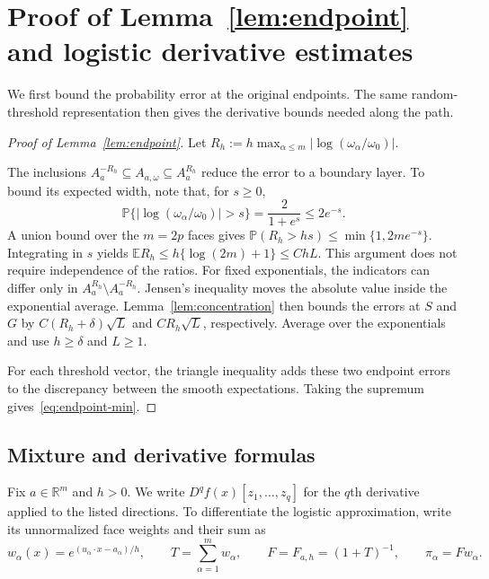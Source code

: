 \documentclass[11pt,letterpaper]{article}
\theoremstyle{remark}
\newcommand{\E}{\mathbb E}
\newcommand{\Pp}{\mathbb P}
\newcommand{\R}{\mathbb R}
\begin{document}
\clearpage
\appendix
{}

\section{Proof of Lemma~\ref*{lem:endpoint} and logistic derivative estimates}\label{appx-sec:smoothing}
We first bound the probability error at the original endpoints.
The same random-threshold representation then gives the derivative
bounds needed along the path.
\begin{proof}[Proof of Lemma~\ref{lem:endpoint}]
Let \(R_h:=h\max_{\alpha\le m}|\log(\omega_\alpha/\omega_0)|\).

The inclusions \(A_a^{-R_h}\subseteq A_{a,\omega}\subseteq A_a^{R_h}\)
reduce the error to a boundary layer. To bound its expected width,
note that, for \(s\ge0\),
\[
 \Pp\{|\log(\omega_\alpha/\omega_0)|>s\}
 =\frac2{1+e^s}\le2e^{-s}.
\]
A union bound over the \(m=2p\) faces gives
\(\Pp(R_h>hs)\le\min\{1,2me^{-s}\}\). Integrating in \(s\)
yields \(\E R_h\le h\{\log(2m)+1\}\le ChL\). This argument
does not require independence of the ratios.
For fixed exponentials, the indicators can differ only in
\(A_a^{R_h}\setminus A_a^{-R_h}\). Jensen's inequality moves
the absolute value inside the exponential average.
Lemma~\ref{lem:concentration} then bounds the errors at \(S\)
and \(G\) by \(C(R_h+\delta)\sqrt L\) and \(CR_h\sqrt L\),
respectively. Average over the exponentials and use \(h\ge\delta\)
and \(L\ge1\).

For each threshold vector, the triangle inequality adds these two
endpoint errors to the discrepancy between the smooth expectations.
Taking the supremum gives~\eqref{eq:endpoint-min}.
\end{proof}

\subsection{\texorpdfstring{Mixture and derivative formulas}{Mixture and derivative formulas}}\label{appx-sec:mixture}

Fix \(a\in\R^m\) and \(h>0\). We write
\(D^qf(x)[z_1,\ldots,z_q]\) for the \(q\)th derivative applied to
the listed directions. To differentiate the logistic approximation,
write its unnormalized face weights and their sum as
\[
 w_\alpha(x)=e^{(u_\alpha\cdot x-a_\alpha)/h},\qquad
 T=\sum_{\alpha=1}^m w_\alpha,\qquad
 F=F_{a,h}=(1+T)^{-1},\qquad \pi_\alpha=Fw_\alpha.
\]
\end{document}

